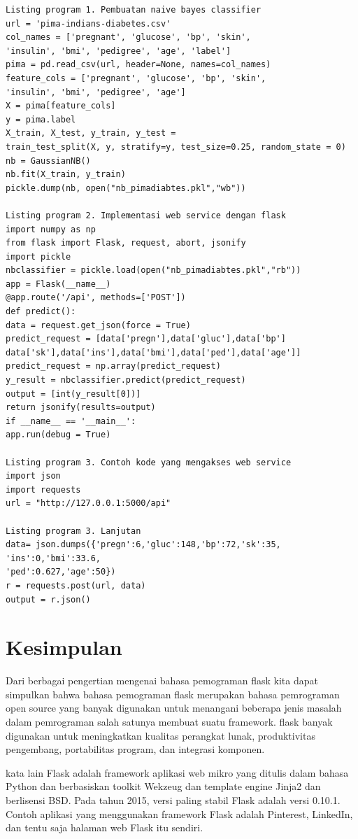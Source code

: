 \begin{verbatim}
Listing program 1. Pembuatan naive bayes classifier
url = 'pima-indians-diabetes.csv'
col_names = ['pregnant', 'glucose', 'bp', 'skin',
'insulin', 'bmi', 'pedigree', 'age', 'label']
pima = pd.read_csv(url, header=None, names=col_names)
feature_cols = ['pregnant', 'glucose', 'bp', 'skin',
'insulin', 'bmi', 'pedigree', 'age']
X = pima[feature_cols]
y = pima.label
X_train, X_test, y_train, y_test =
train_test_split(X, y, stratify=y, test_size=0.25, random_state = 0)
nb = GaussianNB()
nb.fit(X_train, y_train)
pickle.dump(nb, open("nb_pimadiabtes.pkl","wb"))

Listing program 2. Implementasi web service dengan flask
import numpy as np
from flask import Flask, request, abort, jsonify
import pickle
nbclassifier = pickle.load(open("nb_pimadiabtes.pkl","rb"))
app = Flask(__name__)
@app.route('/api', methods=['POST'])
def predict():
data = request.get_json(force = True)
predict_request = [data['pregn'],data['gluc'],data['bp']
data['sk'],data['ins'],data['bmi'],data['ped'],data['age']]
predict_request = np.array(predict_request)
y_result = nbclassifier.predict(predict_request)
output = [int(y_result[0])]
return jsonify(results=output)
if __name__ == '__main__':
app.run(debug = True)

Listing program 3. Contoh kode yang mengakses web service
import json
import requests
url = "http://127.0.0.1:5000/api"

Listing program 3. Lanjutan
data= json.dumps({'pregn':6,'gluc':148,'bp':72,'sk':35,
'ins':0,'bmi':33.6,
'ped':0.627,'age':50})
r = requests.post(url, data)
output = r.json()
\end{verbatim}






\section{Kesimpulan}
Dari berbagai pengertian mengenai bahasa pemograman flask kita dapat simpulkan bahwa bahasa pemograman flask merupakan bahasa pemrograman open source yang banyak digunakan untuk menangani beberapa jenis masalah dalam pemrograman salah satunya membuat suatu framework. flask banyak digunakan untuk meningkatkan kualitas perangkat lunak, produktivitas pengembang, portabilitas program, dan integrasi komponen.

kata lain Flask adalah framework aplikasi web mikro yang ditulis dalam bahasa Python dan berbasiskan toolkit Wekzeug dan template engine Jinja2 dan berlisensi BSD. Pada tahun 2015, versi paling stabil Flask adalah versi 0.10.1. Contoh aplikasi yang menggunakan framework Flask adalah Pinterest, LinkedIn, dan tentu saja halaman web Flask itu sendiri.

